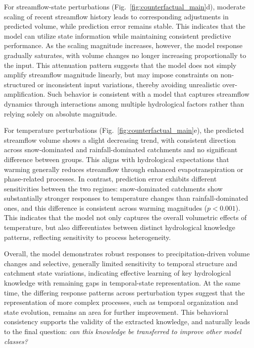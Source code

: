 For streamflow-state perturbations (Fig.~\ref{fig:counterfactual_main}d), moderate scaling of recent streamflow history leads to corresponding adjustments in predicted volume, while prediction error remains stable. This indicates that the model can utilize state information while maintaining consistent predictive performance. As the scaling magnitude increases, however, the model response gradually saturates, with volume changes no longer increasing proportionally to the input. This attenuation pattern suggests that the model does not simply amplify streamflow magnitude linearly, but may impose constraints on non-structured or inconsistent input variations, thereby avoiding unrealistic over-amplification. Such behavior is consistent with a model that captures streamflow dynamics through interactions among multiple hydrological factors\cite{bloschl2017changing} rather than relying solely on absolute magnitude.

For temperature perturbations (Fig.~\ref{fig:counterfactual_main}e), the predicted streamflow volume shows a slight decreasing trend, with consistent direction across snow-dominated and rainfall-dominated catchments and no significant difference between groups. This aligns with hydrological expectations that warming generally reduces streamflow through enhanced evapotranspiration or phase-related processes. In contrast, prediction error exhibits different sensitivities between the two regimes: snow-dominated catchments show substantially stronger responses to temperature changes than rainfall-dominated ones\cite{milly2020colorado}, and this difference is consistent across warming magnitudes ($p < 0.001$). This indicates that the model not only captures the overall volumetric effects of temperature, but also differentiates between distinct hydrological knowledge patterns, reflecting sensitivity to process heterogeneity.

Overall, the model demonstrates robust responses to precipitation-driven volume changes and selective, generally limited sensitivity to temporal structure and catchment state variations\cite{LouiseSlater2024_XAI_Hydrology}, indicating effective learning of key hydrological knowledge with remaining gaps in temporal-state representation. At the same time, the differing response patterns across perturbation types suggest that the representation of more complex processes, such as temporal organization and state evolution, remains an area for further improvement. This behavioral consistency supports the validity of the extracted knowledge, and naturally leads to the final question: \textit{can this knowledge be transferred to improve other model classes?}

